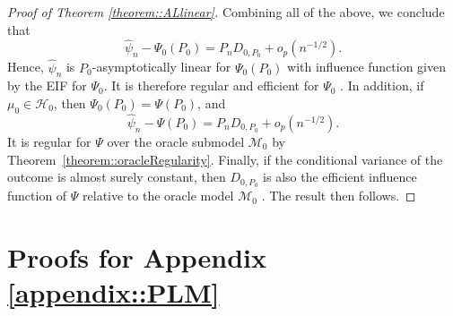\documentclass[11pt]{article}
\theoremstyle{definition}
\begin{document}
\begin{proof}[Proof of Theorem \ref{theorem::ALlinear}]
Combining all of the above, we conclude that
\[
    \widehat{\psi}_n - \Psi_0(P_0) = P_n D_{0,P_0} + o_p(n^{-1/2}).
\]
Hence, $\widehat{\psi}_n$ is $P_0$-asymptotically linear for $\Psi_0(P_0)$ with influence function given by the EIF for $\Psi_0$. It is therefore regular and efficient for $\Psi_0$ \citep{vanderVaartWellner}. In addition, if $\mu_0 \in \mathcal{H}_0$, then $\Psi_0(P_0) = \Psi(P_0)$, and
\[
    \widehat{\psi}_n - \Psi(P_0) = P_n D_{0,P_0} + o_p(n^{-1/2}).
\]
It is regular for $\Psi$ over the oracle submodel $\mathcal{M}_0$ by Theorem~\ref{theorem::oracleRegularity}. Finally, if the conditional variance of the outcome is almost surely constant, then $D_{0,P_0}$ is also the efficient influence function of $\Psi$ relative to the oracle model $\mathcal{M}_0$ \citep{chernoRegRiesz}. The result then follows.


 


\end{proof}


 

 
 
 
 

\section{Proofs for Appendix \ref{appendix::PLM}}
\end{document}
